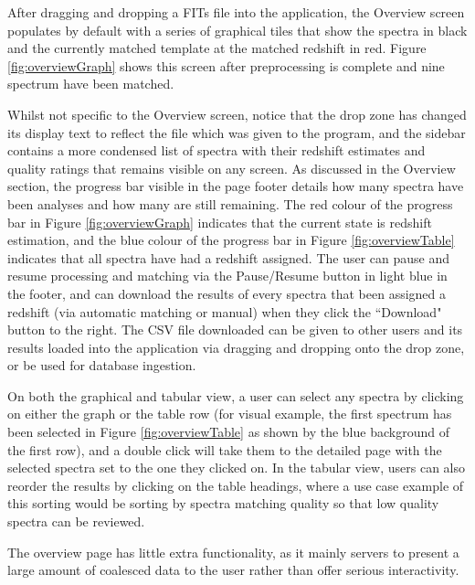 \documentclass[titlesmallcaps, examinerscopy, copyrightpage]{uqthesis}
\begin{document}
After dragging and dropping a FITs file into the application, the Overview screen populates by default with a series of graphical tiles that show the spectra in black and the currently matched template at the matched redshift in red. Figure \ref{fig:overviewGraph} shows this screen after preprocessing is complete and nine spectrum have been matched.

Whilst not specific to the Overview screen, notice that the drop zone has changed its display text to reflect the file which was given to the program, and the sidebar contains a more condensed list of spectra with their redshift estimates and quality ratings that remains visible on any screen. As discussed in the Overview section, the progress bar visible in the page footer details how many spectra have been analyses and how many are still remaining. The red colour of the progress bar in Figure \ref{fig:overviewGraph} indicates that the current state is redshift estimation, and the blue colour of the progress bar in Figure \ref{fig:overviewTable} indicates that all spectra have had a redshift assigned. The user can pause and resume processing and matching via the Pause/Resume button in light blue in the footer, and can download the results of every spectra that been assigned a redshift (via automatic matching or manual) when they click the ``Download" button to the right. The CSV file downloaded can be given to other users and its results loaded into the application via dragging and dropping onto the drop zone, or be used for database ingestion.

On both the graphical and tabular view, a user can select any spectra by clicking on either the graph or the table row (for visual example, the first spectrum has been selected in Figure \ref{fig:overviewTable} as shown by the blue background of the first row), and a double click will take them to the detailed page with the selected spectra set to the one they clicked on. In the tabular view, users can also reorder the results by clicking on the table headings, where a use case example of this sorting would be sorting by spectra matching quality so that low quality spectra can be reviewed.

The overview page has little extra functionality, as it mainly servers to present a large amount of coalesced data to the user rather than offer serious interactivity. 
\end{document}
